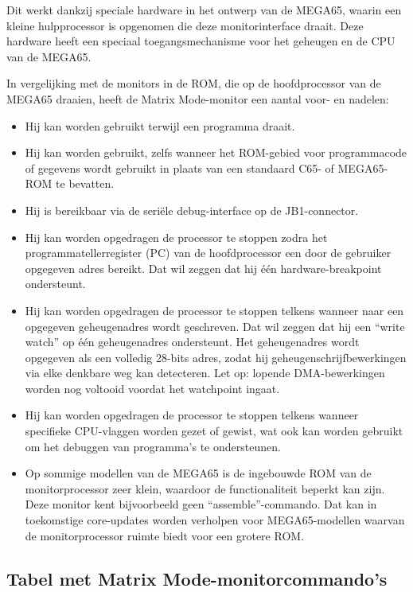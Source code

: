 Dit werkt dankzij speciale hardware in het ontwerp van de MEGA65, waarin een kleine hulpprocessor is opgenomen die deze monitorinterface draait. Deze hardware heeft een speciaal toegangsmechanisme voor het geheugen en de CPU van de MEGA65.

In vergelijking met de monitors in de ROM, die op de hoofdprocessor van de MEGA65 draaien, heeft de Matrix Mode-monitor een aantal voor- en nadelen:
\begin{itemize}
\item Hij kan worden gebruikt terwijl een programma draait.\item Hij kan worden gebruikt, zelfs wanneer het ROM-gebied voor programmacode of gegevens wordt gebruikt in plaats van een standaard C65- of MEGA65-ROM te bevatten.\item Hij is bereikbaar via de seriële debug-interface op de JB1-connector.\item Hij kan worden opgedragen de processor te stoppen zodra het programmatellerregister (PC) van de hoofdprocessor een door de gebruiker opgegeven adres bereikt. Dat wil zeggen dat hij één hardware-breakpoint ondersteunt.\item Hij kan worden opgedragen de processor te stoppen telkens wanneer naar een opgegeven geheugenadres wordt geschreven. Dat wil zeggen dat hij een ``write watch'' op één geheugenadres ondersteunt. Het geheugenadres wordt opgegeven als een volledig 28-bits adres, zodat hij geheugenschrijfbewerkingen via elke denkbare weg kan detecteren. Let op: lopende DMA-bewerkingen worden nog voltooid voordat het watchpoint ingaat.\item Hij kan worden opgedragen de processor te stoppen telkens wanneer specifieke CPU-vlaggen worden gezet of gewist, wat ook kan worden gebruikt om het debuggen van programma's te ondersteunen.\item Op sommige modellen van de MEGA65 is de ingebouwde ROM van de monitorprocessor zeer klein, waardoor de functionaliteit beperkt kan zijn. Deze monitor kent bijvoorbeeld geen ``assemble''-commando. Dat kan in toekomstige core-updates worden verholpen voor MEGA65-modellen waarvan de monitorprocessor ruimte biedt voor een grotere ROM.
\end{itemize}

\subsection{Tabel met Matrix Mode-mon\-itorcom\-mando's}

